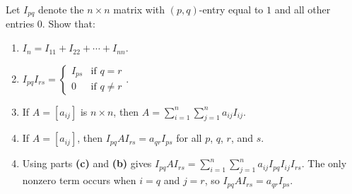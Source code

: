 \documentclass{ximera}
\begin{document}
\begin{problem}\label{ex:ex2_suppl_6}
Let $I_{pq}$ denote the $n \times n$ matrix with $(p, q)$-entry equal to $1$ and all other entries $0$. Show that:


\begin{enumerate}[label={\alph*.}]
\item $I_{n} = I_{11} + I_{22} + \cdots  + I_{nn}$.

\item $I_{pq}I_{rs} = \left\lbrace \begin{array}{cl}
I_{ps} & \mbox{if } q = r \\
0 & \mbox{if } q \neq r
\end{array} \right.$.

\item If $A = \left[ a_{ij} \right]$ is $n \times n$, then $A = \sum_{i=1}^{n} \sum_{j=1}^{n} a_{ij}I_{ij}$.


\item If $A = \left[ a_{ij} \right]$, then $I_{pq}AI_{rs} = a_{qr}I_{ps}$ for all $p$, $q$, $r$, and $s$.

\end{enumerate}
\begin{hint}
\begin{enumerate}[label={\alph*.}]
\setcounter{enumi}{3}
\item  Using parts \textbf{(c)} and \textbf{(b)} gives $I_{pq}AI_{rs} = \sum_{i=1}^{n} \sum_{j=1}^{n} a_{ij}I_{pq}I_{ij}I_{rs}$. The only nonzero term occurs when $i = q$ and $j = r$, so $I_{pq}AI_{rs} = a_{qr}I_{ps}$.

\end{enumerate}
\end{hint}
\end{problem}
\end{document}
